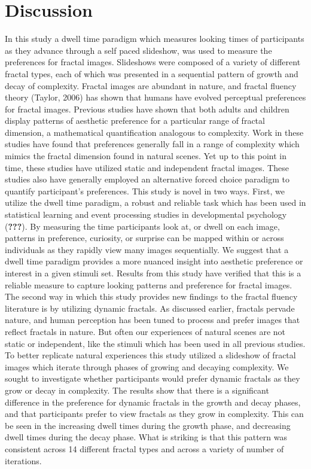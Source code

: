 \documentclass[english,jou]{apa6}
\begin{document}
\hypertarget{discussion}{%
\section{Discussion}\label{discussion}}

In this study a dwell time paradigm which measures looking times of participants as they advance through a self paced slideshow, was used to measure the preferences for fractal images. Slideshows were composed of a variety of different fractal types, each of which was presented in a sequential pattern of growth and decay of complexity. Fractal images are abundant in nature, and fractal fluency theory (Taylor, 2006) has shown that humans have evolved perceptual preferences for fractal images. Previous studies have shown that both adults and children display patterns of aesthetic preference for a particular range of fractal dimension, a mathematical quantification analogous to complexity. Work in these studies have found that preferences generally fall in a range of complexity which mimics the fractal dimension found in natural scenes. Yet up to this point in time, these studies have utilized static and independent fractal images. These studies also have generally employed an alternative forced choice paradigm to quantify participant's preferences. This study is novel in two ways. First, we utilize the dwell time paradigm, a robust and reliable task which has been used in statistical learning and event processing studies in developmental psychology ({\textbf{???}}). By measuring the time participants look at, or dwell on each image, patterns in preference, curiosity, or surprise can be mapped within or across individuals as they rapidly view many images sequentially. We suggest that a dwell time paradigm provides a more nuanced insight into aesthetic preference or interest in a given stimuli set. Results from this study have verified that this is a reliable measure to capture looking patterns and preference for fractal images. The second way in which this study provides new findings to the fractal fluency literature is by utilizing dynamic fractals. As discussed earlier, fractals pervade nature, and human perception has been tuned to process and prefer images that reflect fractals in nature. But often our experiences of natural scenes are not static or independent, like the stimuli which has been used in all previous studies. To better replicate natural experiences this study utilized a slideshow of fractal images which iterate through phases of growing and decaying complexity. We sought to investigate whether participants would prefer dynamic fractals as they grow or decay in complexity. The results show that there is a significant difference in the preference for dynamic fractals in the growth and decay phases, and that participants prefer to view fractals as they grow in complexity. This can be seen in the increasing dwell times during the growth phase, and decreasing dwell times during the decay phase. What is striking is that this pattern was consistent across 14 different fractal types and across a variety of number of iterations.
\end{document}
